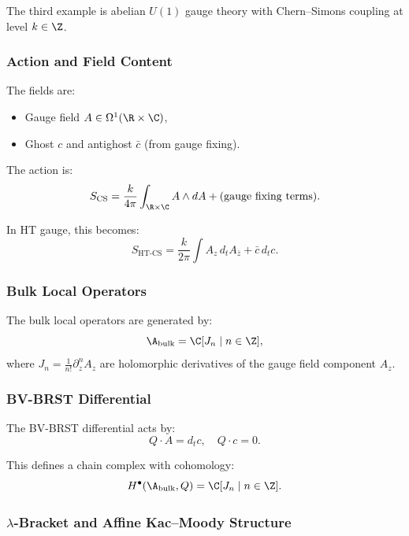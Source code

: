 The third example is abelian $U(1)$ gauge theory with Chern--Simons coupling at level $k \in \Z$.

\subsubsection{Action and Field Content}

The fields are:
\begin{itemize}
\item Gauge field $A \in \Omega^1(\R \times \C)$,
\item Ghost $c$ and antighost $\bar{c}$ (from gauge fixing).
\end{itemize}

The action is:
\begin{equation}
S_{\text{CS}} = \frac{k}{4\pi} \int_{\R \times \C} A \wedge dA + \text{(gauge fixing terms)}.
\end{equation}

In HT gauge, this becomes:
\begin{equation}
S_{\text{HT-CS}} = \frac{k}{2\pi} \int A_z \, d_t A_{\bar{z}} + \bar{c} \, d_t c.
\end{equation}

\subsubsection{Bulk Local Operators}

The bulk local operators are generated by:
\begin{equation}
\A_{\text{bulk}} = \C[J_n \mid n \in \Z],
\end{equation}
where $J_n = \frac{1}{n!} \partial_z^n A_z$ are holomorphic derivatives of the gauge field component $A_z$.

\subsubsection{BV-BRST Differential}

The BV-BRST differential acts by:
\begin{equation}
Q \cdot A = d_t c, \quad Q \cdot c = 0.
\end{equation}

This defines a chain complex with cohomology:
\begin{equation}
H^\bullet(\A_{\text{bulk}}, Q) = \C[J_n \mid n \in \Z].
\end{equation}

\subsubsection{$\lambda$-Bracket and Affine Kac--Moody Structure}

